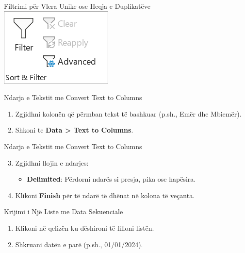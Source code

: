 \documentclass[
  ignorenonframetext,
]{beamer}
\providecommand{\tightlist}{%
  \setlength{\itemsep}{0pt}\setlength{\parskip}{0pt}}
\begin{document}
\begin{frame}{Filtrimi për Vlera Unike ose Heqja e Duplikatëve}
\label{filtrimi-puxebr-vlera-unike-ose-heqja-e-duplikatuxebve-1}
\includegraphics{./images/excel8.png}
\end{frame}

\begin{frame}{Ndarja e Tekstit me Convert Text to Columns}
\label{ndarja-e-tekstit-me-convert-text-to-columns}
\begin{enumerate}
\item
  Zgjidhni kolonën që përmban tekst të bashkuar (p.sh., Emër dhe
  Mbiemër).
\item
  Shkoni te \textbf{Data \textgreater{} Text to Columns}.
\end{enumerate}
\end{frame}

\begin{frame}{Ndarja e Tekstit me Convert Text to Columns}
\label{ndarja-e-tekstit-me-convert-text-to-columns-1}
\begin{enumerate}
\setcounter{enumi}{2}
\item
  Zgjidhni llojin e ndarjes:

  \begin{itemize}
  \tightlist
  \item
    \textbf{Delimited}: Përdorni ndarës si presja, pika ose hapësira.
  \end{itemize}
\item
  Klikoni \textbf{Finish} për të ndarë të dhënat në kolona të veçanta.
\end{enumerate}
\end{frame}

\begin{frame}{Krijimi i Një Liste me Data Sekuenciale}
\label{krijimi-i-njuxeb-liste-me-data-sekuenciale}
\begin{enumerate}
\item
  Klikoni në qelizën ku dëshironi të filloni listën.
\item
  Shkruani datën e parë (p.sh., 01/01/2024).
\end{enumerate}
\end{frame}
\end{document}
